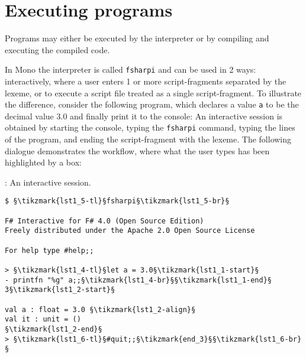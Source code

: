 \section{Executing programs}
Programs may either be executed by the interpreter or by compiling and executing the compiled code. 

In Mono the interpreter is called \lstinline[language=console]{fsharpi} and can be used in 2 ways: interactively, where a user enters 1 or more script-fragments separated by the \lexeme{;;} lexeme, or to execute a script file treated as a single script-fragment. To illustrate the difference, consider the following program, which declares a value \lstinline{a} to be the decimal value 3.0 and finally print it to the console:
An interactive session is obtained by starting the console, typing the \lstinline[language=console]{fsharpi} command, typing the lines of the program, and ending the script-fragment with the \lexeme{;;} lexeme. The following dialogue demonstrates the workflow, where what the user types has been highlighted by a box:
\begin{codeNOutput}{: An interactive session.}
  \begin{lstlisting}[language=console,escapechar=§]
$ §\tikzmark{lst1_5-tl}§fsharpi§\tikzmark{lst1_5-br}§

F# Interactive for F# 4.0 (Open Source Edition)
Freely distributed under the Apache 2.0 Open Source License

For help type #help;;

> §\tikzmark{lst1_4-tl}§let a = 3.0§\tikzmark{lst1_1-start}§
- printfn "%g" a;;§\tikzmark{lst1_4-br}§§\tikzmark{lst1_1-end}§
3§\tikzmark{lst1_2-start}§

val a : float = 3.0 §\tikzmark{lst1_2-align}§
val it : unit = ()
§\tikzmark{lst1_2-end}§
> §\tikzmark{lst1_6-tl}§#quit;;§\tikzmark{end_3}§§\tikzmark{lst1_6-br}§
\end{lstlisting}%
\end{codeNOutput}
%
